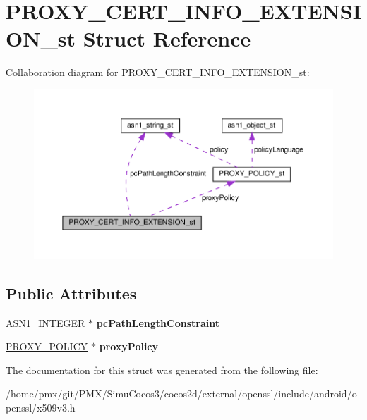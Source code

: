 \hypertarget{structPROXY__CERT__INFO__EXTENSION__st}{}\section{P\+R\+O\+X\+Y\+\_\+\+C\+E\+R\+T\+\_\+\+I\+N\+F\+O\+\_\+\+E\+X\+T\+E\+N\+S\+I\+O\+N\+\_\+st Struct Reference}
\label{structPROXY__CERT__INFO__EXTENSION__st}


Collaboration diagram for P\+R\+O\+X\+Y\+\_\+\+C\+E\+R\+T\+\_\+\+I\+N\+F\+O\+\_\+\+E\+X\+T\+E\+N\+S\+I\+O\+N\+\_\+st\+:
\nopagebreak
\begin{figure}[H]
\begin{center}
\leavevmode
\includegraphics[width=350pt]{structPROXY__CERT__INFO__EXTENSION__st__coll__graph}
\end{center}
\end{figure}
\subsection*{Public Attributes}
\begin{DoxyCompactItemize}
\item 
\mbox{\label{structPROXY__CERT__INFO__EXTENSION__st_a0668e59ca791b92d711682c82482f74c}} 
\hyperlink{structasn1__string__st}{A\+S\+N1\+\_\+\+I\+N\+T\+E\+G\+ER} $\ast$ {\bfseries pc\+Path\+Length\+Constraint}
\item 
\mbox{\label{structPROXY__CERT__INFO__EXTENSION__st_ae4b3bf2922c8a1aa47c86fb99fbbc3b9}} 
\hyperlink{structPROXY__POLICY__st}{P\+R\+O\+X\+Y\+\_\+\+P\+O\+L\+I\+CY} $\ast$ {\bfseries proxy\+Policy}
\end{DoxyCompactItemize}


The documentation for this struct was generated from the following file\+:\begin{DoxyCompactItemize}
\item 
/home/pmx/git/\+P\+M\+X/\+Simu\+Cocos3/cocos2d/external/openssl/include/android/openssl/x509v3.\+h\end{DoxyCompactItemize}
